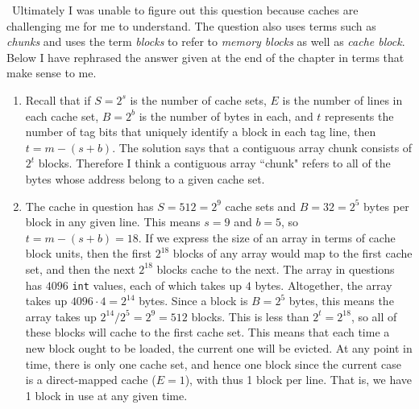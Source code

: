 \documentclass[12pt]{article}
\newenvironment{sol}[1][Solution]{\begin{trivlist}
		\item[\hskip \labelsep {\bfseries #1:}]}{\end{trivlist}}
\begin{document}
\begin{sol}
	\
	Ultimately I was unable to figure out this question because caches are challenging me for
	me to understand. The question also uses terms such as \emph{chunks} and uses the term
	\emph{blocks} to refer to \emph{memory blocks} as well as \emph{cache block}. Below I have
	rephrased the answer given at the end of the chapter in terms that make sense to me.
	\begin{enumerate}[label=(\alph*)]
		\item Recall that if $S=2^s$ is the number of cache sets, $E$ is the number of lines in
		each cache set, $B=2^b$ is the number of bytes in each, and $t$ represents the
		number of tag bits that uniquely identify a block in each tag line, then $t=m-(s+b)$.
		The solution says that a contiguous array chunk consists of $2^t$ blocks.
		Therefore I think a contiguous array ``chunk" refers to all of the bytes whose address
		belong to a given cache set.
		
		\item The cache in question has $S=512=2^9$ cache sets and $B=32=2^5$ bytes per block
		in any given line. This means $s=9$ and $b=5$, so $t=m-(s+b)=18$. If we express the
		size of an array in terms of cache block units, then the first $2^{18}$ blocks of
		any array would map to the first cache set, and then the next $2^{18}$ blocks cache
		to the next. The array in questions has $4096$ \texttt{int} values, each of which
		takes up $4$ bytes. Altogether, the array takes up $4096\cdot 4=2^{14}$ bytes.
		Since a block is $B=2^{5}$ bytes, this means the array takes up $2^{14}/2^{5}=2^9=512$
		blocks. This is less than $2^{t}=2^{18}$, so all of these blocks will cache to the
		first cache set. This means that each time a new block ought to be loaded, the current
		one will be evicted. At any point in time, there is only one cache set, and hence one
		block since the current case is a direct-mapped cache ($E=1$), with thus 1 block
		per line. That is, we have 1 block in use at any given time.
	\end{enumerate}
\end{sol}
\end{document}
